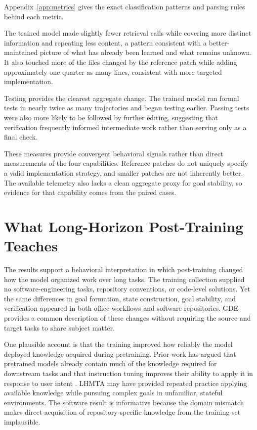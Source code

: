 \documentclass{article}
\begin{document}
Appendix~\ref{app:metrics} gives the exact classification patterns and parsing rules behind each metric.

The trained model made slightly fewer retrieval calls while covering more distinct information and repeating less content, a pattern consistent with a better-maintained picture of what has already been learned and what remains unknown. It also touched more of the files changed by the reference patch while adding approximately one quarter as many lines, consistent with more targeted implementation.

Testing provides the clearest aggregate change. The trained model ran formal tests in nearly twice as many trajectories and began testing earlier. Passing tests were also more likely to be followed by further editing, suggesting that verification frequently informed intermediate work rather than serving only as a final check.

These measures provide convergent behavioral signals rather than direct measurements of the four capabilities. Reference patches do not uniquely specify a valid implementation strategy, and smaller patches are not inherently better. The available telemetry also lacks a clean aggregate proxy for goal stability, so evidence for that capability comes from the paired cases.

\section{What Long-Horizon Post-Training Teaches}
\label{sec:discussion}

The results support a behavioral interpretation in which post-training changed how the model organized work over long tasks. The training collection supplied no software-engineering tasks, repository conventions, or code-level solutions. Yet the same differences in goal formation, state construction, goal stability, and verification appeared in both office workflows and software repositories. GDE provides a common description of these changes without requiring the source and target tasks to share subject matter.

One plausible account is that the training improved how reliably the model deployed knowledge acquired during pretraining. Prior work has argued that pretrained models already contain much of the knowledge required for downstream tasks and that instruction tuning improves their ability to apply it in response to user intent \citep{zhou2023lima, ouyang2022instructions}. LHMTA may have provided repeated practice applying available knowledge while pursuing complex goals in unfamiliar, stateful environments. The software result is informative because the domain mismatch makes direct acquisition of repository-specific knowledge from the training set implausible.
\end{document}
